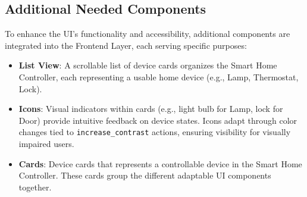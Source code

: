 \documentclass[openany]{book}
\begin{document}
    \subsection{Additional Needed Components}
    To enhance the UI’s functionality and accessibility, additional components are integrated into the Frontend Layer, each serving specific purposes:
    \begin{itemize}
        \item \textbf{List View}: A scrollable list of device cards organizes the Smart Home Controller, each representing a usable home device (e.g., Lamp, Thermostat, Lock).
        \item \textbf{Icons}: Visual indicators within cards (e.g., light bulb for Lamp, lock for Door) provide intuitive feedback on device states. Icons adapt through color changes tied to \verb|increase_contrast| actions, ensuring visibility for visually impaired users.
        \item \textbf{Cards}: Device cards that represents a controllable device in the Smart Home Controller. These cards group the different adaptable UI components together.
    \end{itemize}
\end{document}
